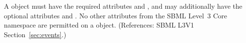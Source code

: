 A \Trigger object must have the required attributes  and , and may additionally have the optional attributes  and
.  No other attributes from the SBML Level~3 Core namespace
are permitted on a \Trigger object.  (References: SBML L3V1
Section~\ref{sec:events}.)
